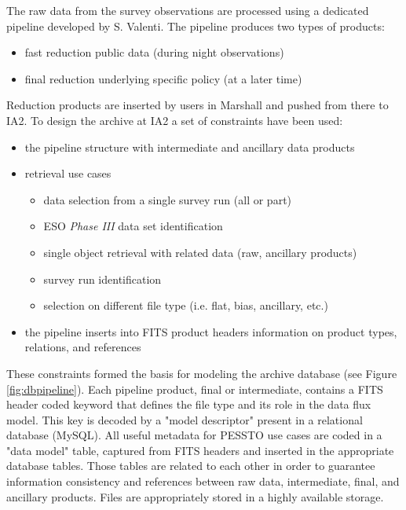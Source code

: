 The raw data from the survey observations are processed using a dedicated pipeline developed by S. Valenti. The pipeline produces two types of products:
\begin{itemize}[noitemsep,nolistsep]
	\item fast reduction public data (during night observations)
	\item final reduction underlying specific policy (at a later time)
\end{itemize}
Reduction products are inserted by users in Marshall and pushed from there to IA2. 
To design the archive at IA2 a set of constraints have been used:
\begin{itemize}[noitemsep,nolistsep]
	\item the pipeline structure with intermediate and ancillary data products
	\item retrieval use cases
		\begin{itemize}[noitemsep,nolistsep]
			\item data selection from a single survey run (all or part)
			\item ESO \textit{Phase III} data set identification
			\item single object retrieval with related data (raw, ancillary products)
			\item survey run identification
			\item selection on different file type (i.e. flat, bias, ancillary, etc.)
		\end{itemize}
	\item the pipeline inserts into FITS product headers information on product types, relations, and references
\end{itemize}
These constraints formed the basis for modeling the archive database (see Figure \ref{fig:dbpipeline}). Each pipeline product, final or intermediate, contains a FITS header coded keyword that defines the file type and its role in the data flux model. This key is decoded by a "model descriptor" present in a relational database (MySQL). All useful metadata for PESSTO use cases are coded in a "data model" table, captured from FITS headers and inserted in the appropriate database tables. Those tables are related to each other in order to guarantee information consistency and references between raw data, intermediate, final, and ancillary products. Files are appropriately stored in a highly available storage.

